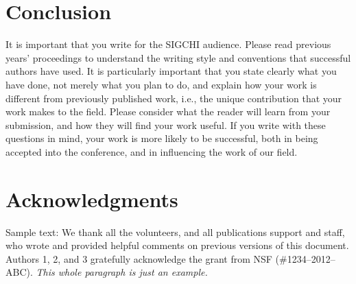\documentclass{sigchi}
\begin{document}
\section{Conclusion}

It is important that you write for the SIGCHI audience. Please read
previous years' proceedings to understand the writing style and
conventions that successful authors have used. It is particularly
important that you state clearly what you have done, not merely what
you plan to do, and explain how your work is different from previously
published work, i.e., the unique contribution that your work makes to
the field. Please consider what the reader will learn from your
submission, and how they will find your work useful. If you write with
these questions in mind, your work is more likely to be successful,
both in being accepted into the conference, and in influencing the
work of our field.

\section{Acknowledgments}

Sample text: We thank all the volunteers, and all publications support
and staff, who wrote and provided helpful comments on previous
versions of this document. Authors 1, 2, and 3 gratefully acknowledge
the grant from NSF (\#1234--2012--ABC). \textit{This whole paragraph is
  just an example.}

%
%
%
%
%
\balance{}
\end{document}
